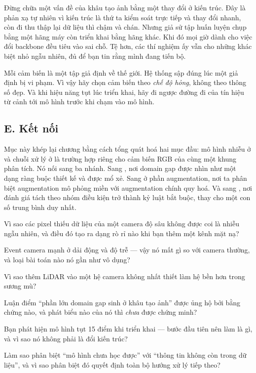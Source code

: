 \documentclass[../../../deep_learning.tex]{subfiles}
\begin{document}
\begin{cambay}
Đừng chữa một vấn đề của khâu tạo ảnh bằng một thay đổi ở kiến trúc. Đây là phản xạ tự nhiên vì kiến trúc là thứ ta kiểm soát trực tiếp và thay đổi nhanh, còn đi thu thập lại dữ liệu thì chậm và chán. Nhưng giả sử tập huấn luyện chụp bằng một hãng máy còn triển khai bằng hãng khác. Khi đó mọi giờ dành cho việc đổi backbone đều tiêu vào sai chỗ. Tệ hơn, các thí nghiệm ấy vẫn cho những khác biệt nhỏ ngẫu nhiên, đủ để bạn tin rằng mình đang tiến bộ.
\end{cambay}

\begin{cannho}
Mỗi cảm biến là một tập giả định về thế giới. Hệ thống sập đúng lúc một giả định bị vi phạm. Vì vậy hãy chọn cảm biến theo \emph{chế độ hỏng}, không theo thông số đẹp. Và khi hiệu năng tụt lúc triển khai, hãy đi ngược đường đi của tín hiệu từ cảnh tới mô hình trước khi chạm vào mô hình. 
\end{cannho}

\subsection{E. Kết nối}
Mục này khép lại chương  bằng cách tổng quát hoá hai mục đầu: mô hình nhiễu ở  và chuỗi xử lý ở  là trường hợp riêng cho cảm biến RGB của cùng một khung phân tích. 
Nó nối sang ba nhánh. Sang , nơi domain gap được nhìn như một dạng ràng buộc thiết kế và  được mổ xẻ. Sang  ở phần augmentation, nơi ta phân biệt augmentation mô phỏng miền với augmentation chính quy hoá. Và sang , nơi đánh giá tách theo nhóm điều kiện trở thành kỷ luật bắt buộc, thay cho một con số trung bình duy nhất.

\begin{tukiem}
\item Vì sao các pixel thiếu dữ liệu của một camera độ sâu không được coi là nhiễu ngẫu nhiên, và điều đó tạo ra dạng rò rỉ nào khi bạn thêm một kênh mặt nạ?
\item Event camera mạnh ở dải động và độ trễ --- vậy nó mất gì so với camera thường, và loại bài toán nào nó gần như vô dụng?
\item Vì sao thêm LiDAR vào một hệ camera không nhất thiết làm hệ bền hơn trong sương mù?
\item Luận điểm ``phần lớn domain gap sinh ở khâu tạo ảnh'' được ủng hộ bởi bằng chứng nào, và phát biểu nào của nó thì \emph{chưa} được chứng minh?
\item Bạn phát hiện mô hình tụt 15 điểm khi triển khai --- bước đầu tiên nên làm là gì, và vì sao nó không phải là đổi kiến trúc?
\item Làm sao phân biệt ``mô hình chưa học được'' với ``thông tin không còn trong dữ liệu'', và vì sao phân biệt đó quyết định toàn bộ hướng xử lý tiếp theo?
\end{tukiem}
\ifSubfilesClassLoaded{\printbibliography[title={Nguồn}]}{}
\end{document}
